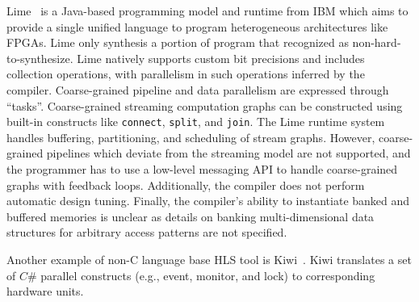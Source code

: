Lime~\cite{lime} is a Java-based programming model and runtime from IBM which aims to provide a single unified language to program heterogeneous architectures like FPGAs.
Lime only synthesis a portion of program that recognized as non-hard-to-synthesize.
Lime natively supports custom bit precisions and includes collection operations, with parallelism in such operations inferred by the compiler.
Coarse-grained pipeline and data parallelism are expressed through ``tasks''.
Coarse-grained streaming computation graphs can be constructed using built-in constructs like \texttt{\small{connect}}, \texttt{\small{split}}, and \texttt{\small{join}}.
The Lime runtime system handles buffering, partitioning, and scheduling of stream graphs.
However, coarse-grained pipelines which deviate from the streaming model are not supported, and the programmer has to use a low-level messaging API to handle coarse-grained graphs with feedback loops.
Additionally, the compiler does not perform automatic design tuning.
Finally, the compiler's ability to instantiate banked and buffered memories is unclear as details on banking multi-dimensional data structures for arbitrary access patterns are not specified.

Another example of non-C language base HLS tool is Kiwi~\cite{kiwi}.
Kiwi translates a set of $C\#$ parallel constructs (e.g., event, monitor, and lock) to corresponding hardware units.